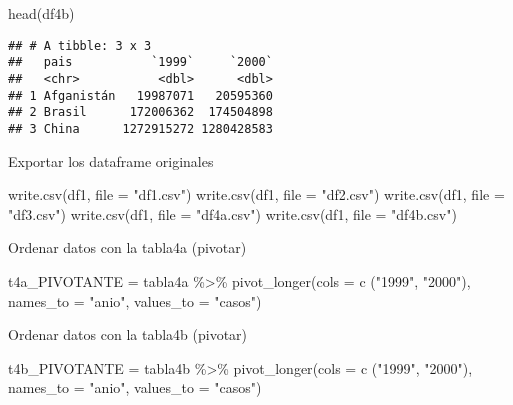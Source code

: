 \documentclass[
]{article}
\newenvironment{Shaded}{\begin{snugshade}}{\end{snugshade}}
\newcommand{\AttributeTok}[1]{\textcolor[rgb]{0.77,0.63,0.00}{#1}}
\newcommand{\FunctionTok}[1]{\textcolor[rgb]{0.00,0.00,0.00}{#1}}
\newcommand{\NormalTok}[1]{#1}
\newcommand{\OtherTok}[1]{\textcolor[rgb]{0.56,0.35,0.01}{#1}}
\newcommand{\SpecialCharTok}[1]{\textcolor[rgb]{0.00,0.00,0.00}{#1}}
\newcommand{\StringTok}[1]{\textcolor[rgb]{0.31,0.60,0.02}{#1}}
\begin{document}
\begin{Shaded}
\begin{Highlighting}[]
\FunctionTok{head}\NormalTok{(df4b)}
\end{Highlighting}
\end{Shaded}

\begin{verbatim}
## # A tibble: 3 x 3
##   pais           `1999`     `2000`
##   <chr>           <dbl>      <dbl>
## 1 Afganistán   19987071   20595360
## 2 Brasil      172006362  174504898
## 3 China      1272915272 1280428583
\end{verbatim}

Exportar los dataframe originales

\begin{Shaded}
\begin{Highlighting}[]
\FunctionTok{write.csv}\NormalTok{(df1, }\AttributeTok{file =} \StringTok{"df1.csv"}\NormalTok{)}
\FunctionTok{write.csv}\NormalTok{(df1, }\AttributeTok{file =} \StringTok{"df2.csv"}\NormalTok{)}
\FunctionTok{write.csv}\NormalTok{(df1, }\AttributeTok{file =} \StringTok{"df3.csv"}\NormalTok{)}
\FunctionTok{write.csv}\NormalTok{(df1, }\AttributeTok{file =} \StringTok{"df4a.csv"}\NormalTok{)}
\FunctionTok{write.csv}\NormalTok{(df1, }\AttributeTok{file =} \StringTok{"df4b.csv"}\NormalTok{)}
\end{Highlighting}
\end{Shaded}

Ordenar datos con la tabla4a (pivotar)

\begin{Shaded}
\begin{Highlighting}[]
\NormalTok{t4a\_PIVOTANTE }\OtherTok{=}\NormalTok{ tabla4a }\SpecialCharTok{\%\textgreater{}\%} 
  \FunctionTok{pivot\_longer}\NormalTok{(}\AttributeTok{cols =} \FunctionTok{c}\NormalTok{ (}\StringTok{"1999"}\NormalTok{, }\StringTok{"2000"}\NormalTok{), }\AttributeTok{names\_to =} \StringTok{"anio"}\NormalTok{, }\AttributeTok{values\_to =} \StringTok{"casos"}\NormalTok{)}
\end{Highlighting}
\end{Shaded}

Ordenar datos con la tabla4b (pivotar)

\begin{Shaded}
\begin{Highlighting}[]
\NormalTok{t4b\_PIVOTANTE }\OtherTok{=}\NormalTok{ tabla4b }\SpecialCharTok{\%\textgreater{}\%} 
  \FunctionTok{pivot\_longer}\NormalTok{(}\AttributeTok{cols =} \FunctionTok{c}\NormalTok{ (}\StringTok{"1999"}\NormalTok{, }\StringTok{"2000"}\NormalTok{), }\AttributeTok{names\_to =} \StringTok{"anio"}\NormalTok{, }\AttributeTok{values\_to =} \StringTok{"casos"}\NormalTok{)}
\end{Highlighting}
\end{Shaded}
\end{document}

